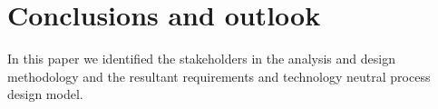 \section{Conclusions and outlook}

In this paper we identified the stakeholders in the analysis and design methodology and the resultant requirements and technology neutral process design model.
